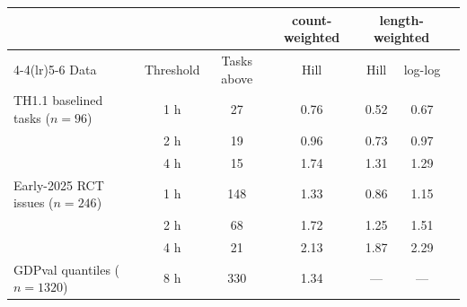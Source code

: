 \begin{tabular}{@{}lcccccc@{}}
\toprule
 & & & \multicolumn{1}{c}{count-weighted} & \multicolumn{2}{c}{length-weighted} \\
\cmidrule(lr){4-4}\cmidrule(lr){5-6}
Data & Threshold & Tasks above & Hill & Hill & log-log \\
\midrule
TH1.1 baselined tasks ($n = 96$) & 1 h & 27 & 0.76 & 0.52 & 0.67 \\
 & 2 h & 19 & 0.96 & 0.73 & 0.97 \\
 & 4 h & 15 & 1.74 & 1.31 & 1.29 \\
Early-2025 RCT issues ($n = 246$) & 1 h & 148 & 1.33 & 0.86 & 1.15 \\
 & 2 h & 68 & 1.72 & 1.25 & 1.51 \\
 & 4 h & 21 & 2.13 & 1.87 & 2.29 \\
GDPval quantiles ($n = 1320$) & 8 h & 330 & 1.34 & --- & --- \\
\bottomrule
\end{tabular}
